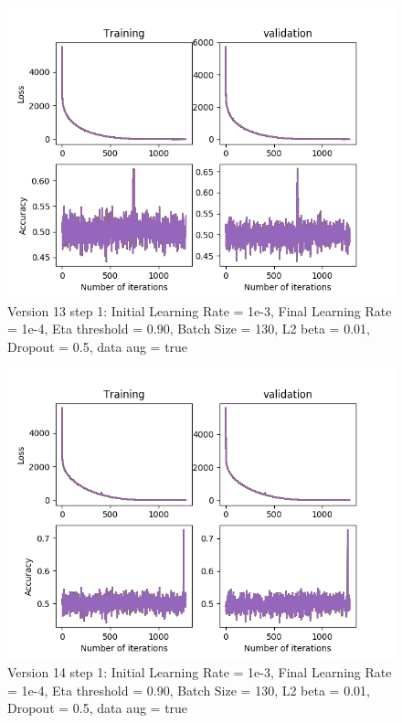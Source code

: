 \documentclass[12pt,reqno]{amsart}
\numberwithin{equation}{section}
\begin{document}
\begin{enumerate}
\begin{figure}[H]
\centering
\includegraphics[scale=0.6]{data_liquid10_version13_step1}
\caption{Version 13 step 1: Initial Learning Rate = 1e-3, Final Learning Rate = 1e-4, Eta threshold = 0.90, Batch Size = 130, L2 beta = 0.01, Dropout = 0.5, data aug = true}
\end{figure}

\begin{figure}[H]
\centering
\includegraphics[scale=0.6]{data_liquid10_version14_step1}
\caption{Version 14 step 1: Initial Learning Rate = 1e-3, Final Learning Rate = 1e-4, Eta threshold = 0.90, Batch Size = 130, L2 beta = 0.01, Dropout = 0.5, data aug = true}
\end{figure}


\end{enumerate}
\end{document}
